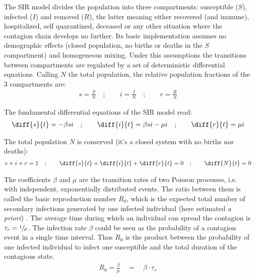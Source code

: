 \documentclass[DIV=12, BCOR=0pt]{scrartcl}  %
\begin{document}
  The SIR model divides the population into three compartments: susceptible ($S$), infected ($I$) and removed ($R$), the latter meaning either recovered (and immune), hospitalized, self quarantined, deceased or any other situation where the contagion chain develops no further. Its basic implementation assumes no demographic effects (closed population, no births or deaths in the $S$ compartment) and homogeneous mixing. Under this assumptions the transitions between compartments are regulated by a set of deterministic differential equations. %
  Calling $N$ the total population, the relative population fractions of the 3 compartments are:
  \begin{align}
			s = \frac{S}{N}  \quad;  \qquad 	 i = \frac{I}{N}  \quad;  \qquad 	 r = \frac{R}{N}
  \end{align}

  The fundamental differential equations of the SIR model read:
  \begin{align}
  	\diff{s}{t} = - \beta s i \quad;  \qquad 	\diff{i}{t} = \beta s i - \mu i \quad; \qquad  \diff{r}{t} = \mu i
  	\label{eq:sir}
  \end{align}

  The total population $N$ is conserved (it's a closed system with no births nor deaths):  
  \begin{align}
  	s + i + r = 1 \quad ; \qquad \diff{s}{t} + \diff{i}{t} + \diff{r}{t} = 0  \quad ; \qquad  \diff{N}{t}= 0
  	\label{eq:sir_sum}
  \end{align}

  The coefficients $\beta$ and $\mu$ are the transition rates of two Poisson processes, i.e. with independent, exponentially distributed events. The ratio between them is called the basic reproduction number $R_0$, which is the expected total number of secondary infections generated by one infected individual (here estimated \textit{a priori}) \citep{R0}.  %
  The average time during which an individual can spread the contagion is $\tau_{r} = \sfrac{1}{\mu}$. The infection rate $\beta$ could be seen as the probability of a contagion event in a single time interval. Thus $R_0$ is the product between the probability of one infected individual to infect one susceptible and the total duration of the contagious state.
  \begin{align}
			R_0 = \frac{\beta}{\mu} \quad = \quad \beta \cdot \tau_{r}
			\label{eq:R0}
  \end{align}
\end{document}
